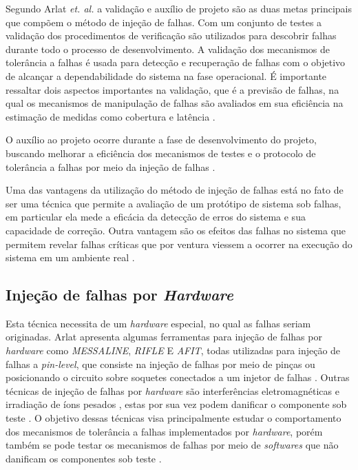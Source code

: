 Segundo Arlat \textit{et. al.} \cite{Arlat:1990} a validação e auxílio de projeto são as duas metas principais que compõem o método de injeção de falhas. Com um conjunto de testes a validação dos procedimentos de verificação são utilizados para descobrir falhas durante todo o processo de desenvolvimento. A validação dos mecanismos de tolerância a falhas é usada para detecção e recuperação de falhas com o objetivo de alcançar a dependabilidade do sistema na fase operacional. É importante ressaltar dois aspectos importantes na validação, que é a previsão de falhas, na qual os mecanismos de manipulação de falhas são avaliados em sua eficiência na estimação de medidas como cobertura e latência \cite{Arlat:1990}.

O auxílio ao projeto ocorre durante a fase de desenvolvimento do projeto, buscando melhorar a eficiência dos mecanismos de testes e o protocolo de tolerância a falhas por meio da injeção de falhas \cite{Arlat:1990}.

Uma das vantagens da utilização do método de injeção de falhas está no fato de ser uma técnica que permite a avaliação de um protótipo de sistema sob falhas, em particular ela mede a eficácia da detecção de erros do sistema e sua capacidade de correção. Outra vantagem são os efeitos das falhas no sistema que permitem revelar falhas críticas que por ventura viessem a ocorrer na execução do sistema em um ambiente real \cite{Arlat:2003}.     

\subsection{Injeção de falhas por \textit{Hardware}}

Esta técnica necessita de um \textit{hardware} especial, no qual as falhas seriam originadas. Arlat \cite{Arlat:2003} apresenta algumas ferramentas para injeção de falhas por \textit{hardware} como \textit{MESSALINE}, \textit{RIFLE} E \textit{AFIT}, todas utilizadas para injeção de falhas a \textit{pin-level}, que consiste na injeção de falhas por meio de pinças ou posicionando o circuito sobre soquetes conectados a um injetor de falhas \cite{Arlat:1990, Arlat:2003}. Outras técnicas de injeção de falhas por \textit{hardware} são interferências eletromagnéticas e irradiação de íons pesados \cite{Gunnelo:1989, Arlat:1990, Arlat:2003}, estas por sua vez podem danificar o componente sob teste \cite{Sotoma:1997}. O objetivo dessas técnicas visa principalmente estudar o comportamento dos mecanismos de tolerância a falhas implementados por \textit{hardware}, porém também se pode testar os mecanismos de falhas por meio de \textit{softwares} que não danificam os componentes sob teste \cite{Martins:1989}.


